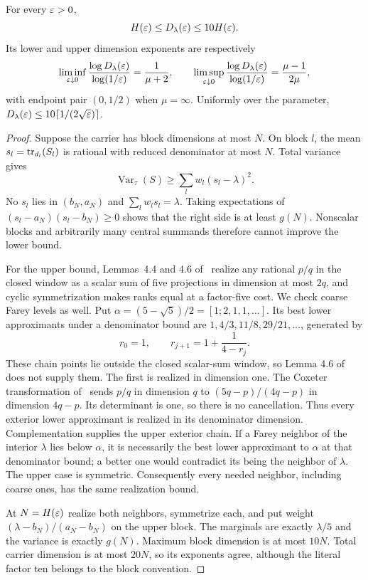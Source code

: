 \begin{theorem}\label{thm:farey}
For every $\varepsilon>0$,
\[
 H(\varepsilon)\le D_\lambda(\varepsilon)\le10H(\varepsilon).
\]
Its lower and upper dimension exponents are respectively
\begin{equation}\label{eq:farey-endpoints}
 \liminf_{\varepsilon\downarrow0}\frac{\log D_\lambda(\varepsilon)}{\log(1/\varepsilon)}
 =\frac1{\mu+2},\qquad
 \limsup_{\varepsilon\downarrow0}\frac{\log D_\lambda(\varepsilon)}{\log(1/\varepsilon)}
 =\frac{\mu-1}{2\mu},
\end{equation}
with endpoint pair $(0,1/2)$ when $\mu=\infty$. Uniformly over the parameter, $D_\lambda(\varepsilon)\le10\lceil1/(2\sqrt{\varepsilon})\rceil$.
\end{theorem}
\begin{proof}
Suppose the carrier has block dimensions at most $N$. On block $l$, the mean $s_l=\operatorname{tr}_{d_l}(S_l)$ is rational with reduced denominator at most $N$. Total variance gives
\[
 \operatorname{Var}_\tau(S)\ge\sum_lw_l(s_l-\lambda)^2.
\]
No $s_l$ lies in $(b_N,a_N)$ and $\sum_lw_ls_l=\lambda$. Taking expectations of $(s_l-a_N)(s_l-b_N)\ge0$ shows that the right side is at least $g(N)$. Nonscalar blocks and arbitrarily many central summands therefore cannot improve the lower bound.

For the upper bound, Lemmas~4.4 and 4.6 of~\cite{KFive} realize any rational $p/q$ in the closed window as a scalar sum of five projections in dimension at most $2q$, and cyclic symmetrization makes ranks equal at a factor-five cost. We check coarse Farey levels as well. Put $\alpha=(5-\sqrt5)/2=[1;2,1,1,\ldots]$. Its best lower approximants under a denominator bound are $1,4/3,11/8,29/21,\ldots$, generated by
\[
 r_0=1,\qquad r_{j+1}=1+\frac1{4-r_j}.
\]
These chain points lie outside the closed scalar-sum window, so Lemma 4.6 of~\cite{KFive} does not supply them. The first is realized in dimension one. The Coxeter transformation of~\cite{KRS} sends $p/q$ in dimension $q$ to $(5q-p)/(4q-p)$ in dimension $4q-p$. Its determinant is one, so there is no cancellation. Thus every exterior lower approximant is realized in its denominator dimension. Complementation supplies the upper exterior chain. If a Farey neighbor of the interior $\lambda$ lies below $\alpha$, it is necessarily the best lower approximant to $\alpha$ at that denominator bound; a better one would contradict its being the neighbor of $\lambda$. The upper case is symmetric. Consequently every needed neighbor, including coarse ones, has the same realization bound.

At $N=H(\varepsilon)$ realize both neighbors, symmetrize each, and put weight $(\lambda-b_N)/(a_N-b_N)$ on the upper block. The marginals are exactly $\lambda/5$ and the variance is exactly $g(N)$. Maximum block dimension is at most $10N$. Total carrier dimension is at most $20N$, so its exponents agree, although the literal factor ten belongs to the block convention.


\end{proof}
